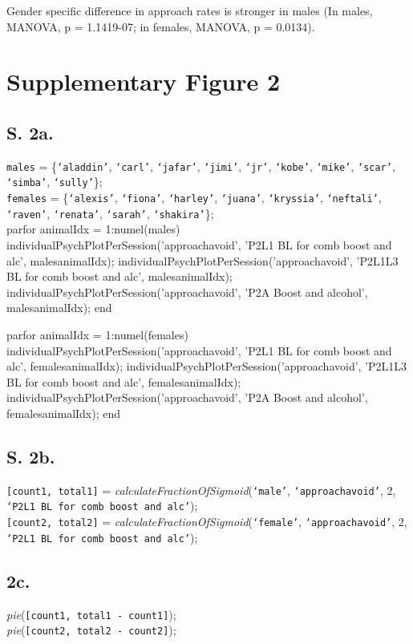 \documentclass{article}
\begin{document}
Gender specific difference in approach rates is stronger in males (In males, MANOVA, p = 1.1419-07; in females, MANOVA, p = 0.0134).


\section{Supplementary Figure 2}
\subsection{S. 2a.}
\texttt{males} = \{\texttt{`aladdin'}, \texttt{`carl'}, \texttt{`jafar'}, \texttt{`jimi'}, \texttt{`jr'}, \texttt{`kobe'}, \texttt{`mike'}, \texttt{`scar'}, \texttt{`simba'}, \texttt{`sully'}\};\\

\texttt{females} = \{\texttt{`alexis'}, \texttt{`fiona'}, \texttt{`harley'}, \texttt{`juana'}, \texttt{`kryssia'}, \texttt{`neftali'}, \texttt{`raven'}, \texttt{`renata'}, \texttt{`sarah'}, \texttt{`shakira'}\};\\

parfor animalIdx = 1:numel(males)
    individualPsychPlotPerSession('approachavoid', 'P2L1 BL for comb boost and alc', males{animalIdx});
    individualPsychPlotPerSession('approachavoid', 'P2L1L3 BL for comb boost and alc', males{animalIdx});
    individualPsychPlotPerSession('approachavoid', 'P2A Boost and alcohol', males{animalIdx});
end

parfor animalIdx = 1:numel(females)
    individualPsychPlotPerSession('approachavoid', 'P2L1 BL for comb boost and alc', females{animalIdx});
    individualPsychPlotPerSession('approachavoid', 'P2L1L3 BL for comb boost and alc', females{animalIdx});
    individualPsychPlotPerSession('approachavoid', 'P2A Boost and alcohol', females{animalIdx});
end

\subsection{S. 2b.}
\texttt{[count1, total1]} = \emph{calculateFractionOfSigmoid}(\texttt{`male'}, \texttt{`approachavoid'}, 2, \texttt{`P2L1 BL for comb boost and alc'});\\
\texttt{[count2, total2]} = \emph{calculateFractionOfSigmoid}(\texttt{`female'}, \texttt{`approachavoid'}, 2, \texttt{`P2L1 BL for comb boost and alc'});\\

\subsection{2c.}
\emph{pie}(\texttt{[count1, total1 - count1]});\\
\emph{pie}(\texttt{[count2, total2 - count2]});\\
\end{document}

